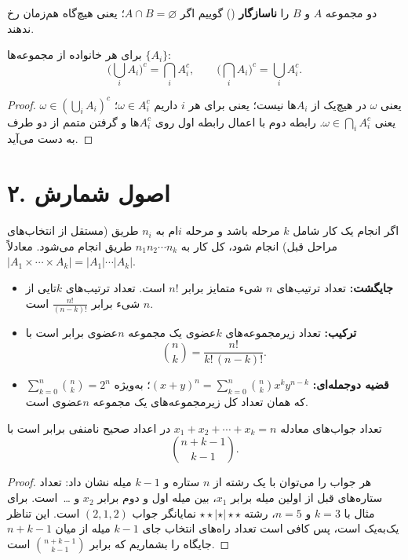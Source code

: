 دو مجموعه $A$ و $B$ را \textbf{ناسازگار} () گوییم اگر $A\cap B=\varnothing$؛ یعنی هیچ‌گاه هم‌زمان رخ ندهند.

\begin{theorem}
برای هر خانواده از مجموعه‌ها $\{A_i\}$:
\[
\Big(\bigcup_i A_i\Big)^c=\bigcap_i A_i^c,\qquad \Big(\bigcap_i A_i\Big)^c=\bigcup_i A_i^c .
\]
\end{theorem}
\begin{proof}
$\omega\in(\bigcup_i A_i)^c$ یعنی $\omega$ در هیچ‌یک از $A_i$ها نیست؛ یعنی برای هر $i$ داریم $\omega\in A_i^c$؛ یعنی $\omega\in\bigcap_i A_i^c$. رابطه دوم با اعمال رابطه اول روی $A_i^c$ها و گرفتن متمم از دو طرف به دست می‌آید.
\end{proof}

\section*{۲. اصول شمارش}

\begin{theorem}
اگر انجام یک کار شامل $k$ مرحله باشد و مرحله $i$ام به $n_i$ طریق (مستقل از انتخاب‌های مراحل قبل) انجام شود، کل کار به $n_1n_2\cdots n_k$ طریق انجام می‌شود. معادلاً $|A_1\times\cdots\times A_k|=|A_1|\cdots|A_k|$.
\end{theorem}

\begin{itemize}
\item \textbf{جایگشت:} تعداد ترتیب‌های $n$ شیء متمایز برابر $n!$ است. تعداد ترتیب‌های $k$تایی از $n$ شیء برابر $\frac{n!}{(n-k)!}$ است.
\item \textbf{ترکیب:} تعداد زیرمجموعه‌های $k$عضوی یک مجموعه $n$عضوی برابر است با
\[\binom{n}{k}=\frac{n!}{k!\,(n-k)!}.\]
\item \textbf{قضیه دوجمله‌ای:} $(x+y)^n=\sum_{k=0}^{n}\binom{n}{k}x^ky^{n-k}$؛ به‌ویژه $\sum_{k=0}^n\binom nk=2^n$ که همان تعداد کل زیرمجموعه‌های یک مجموعه $n$عضوی است.
\end{itemize}

\begin{theorem}\label{thm:stars}
تعداد جواب‌های معادله $x_1+x_2+\cdots+x_k=n$ در اعداد صحیح نامنفی برابر است با
\[\binom{n+k-1}{k-1}.\]
\end{theorem}
\begin{proof}
هر جواب را می‌توان با یک رشته از $n$ ستاره و $k-1$ میله نشان داد: تعداد ستاره‌های قبل از اولین میله برابر $x_1$، بین میله اول و دوم برابر $x_2$ و \ldots\ است. برای مثال با $k=3$ و $n=5$، رشته $\star\star|\star|\star\star$ نمایانگر جواب $(2,1,2)$ است. این تناظر یک‌به‌یک است، پس کافی است تعداد راه‌های انتخاب جای $k-1$ میله از میان $n+k-1$ جایگاه را بشماریم که برابر $\binom{n+k-1}{k-1}$ است.
\end{proof}


